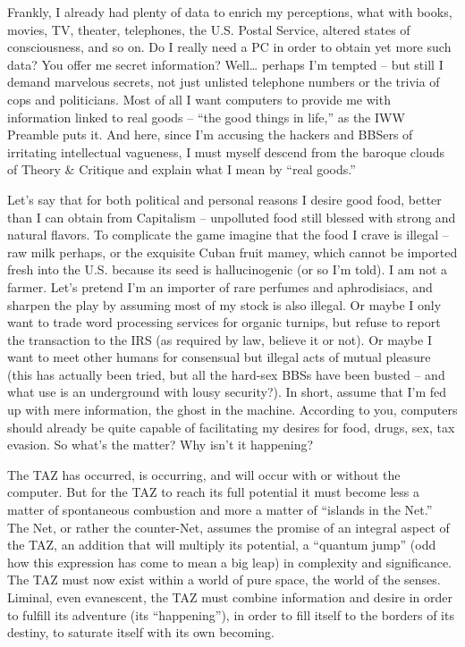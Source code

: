 \documentclass[a4paper,english,10pt,twoside]{article}
\begin{document}
\medskip
Frankly, I already had plenty of data to enrich my perceptions, what with books, movies, TV, theater, telephones, the U.S. Postal Service, altered states of consciousness, and so on. Do I really need a PC in order to obtain yet more such data? You offer me secret information? Well… perhaps I'm tempted -- but still I demand marvelous secrets, not just unlisted telephone numbers or the trivia of cops and politicians. Most of all I want computers to provide me with information linked to real goods -- \enquote{the good things in life,} as the IWW Preamble puts it. And here, since I'm accusing the hackers and BBSers of irritating intellectual vagueness, I must myself descend from the baroque clouds of Theory \& Critique and explain what I mean by \enquote{real goods.}

\medskip
Let's say that for both political and personal reasons I desire good food, better than I can obtain from Capitalism --  unpolluted food still blessed with strong and natural flavors. To complicate the game imagine that the food I crave is illegal -- raw milk perhaps, or the exquisite Cuban fruit mamey, which cannot be imported fresh into the U.S. because its seed is hallucinogenic (or so I'm told). I am not a farmer. Let's pretend I'm an importer of rare perfumes and aphrodisiacs, and sharpen the play by assuming most of my stock is also illegal. Or maybe I only want to trade word processing services for organic turnips, but refuse to report the transaction to the IRS (as required by law, believe it or not). Or maybe I want to meet other humans for consensual but illegal acts of mutual pleasure (this has actually been tried, but all the hard-sex BBSs have been busted -- and what use is an underground with lousy security?). In short, assume that I'm fed up with mere information, the ghost in the machine. According to you, computers should already be quite capable of facilitating my desires for food, drugs, sex, tax evasion. So what's the matter? Why isn't it happening?

\medskip
The TAZ has occurred, is occurring, and will occur with or without the computer. But for the TAZ to reach its full potential it must become less a matter of spontaneous combustion and more a matter of \enquote{islands in the Net.} The Net, or rather the counter-Net, assumes the promise of an integral aspect of the TAZ, an addition that will multiply its potential, a \enquote{quantum jump} (odd how this expression has come to mean a big leap) in complexity and significance. The TAZ must now exist within a world of pure space, the world of the senses. Liminal, even evanescent, the TAZ must combine information and desire in order to fulfill its adventure (its \enquote{happening}), in order to fill itself to the borders of its destiny, to saturate itself with its own becoming.
\end{document}
